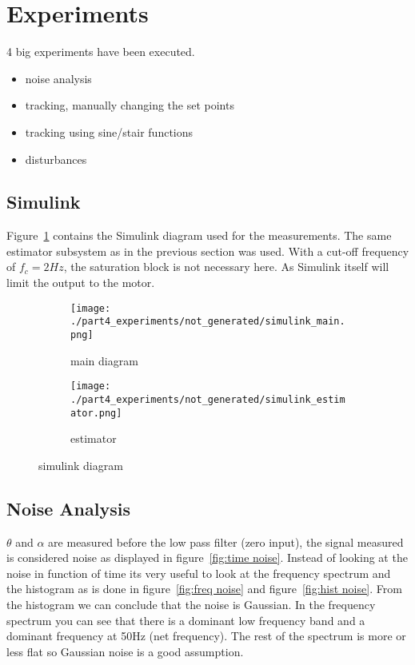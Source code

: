 \section{Experiments}

	4 big experiments have been executed.
	
	\begin{itemize}
		\item noise analysis
		\item tracking, manually changing the set points
		\item tracking using sine/stair functions
		\item disturbances
	\end{itemize}

\subsection{Simulink}
Figure~\ref{fig:simulink measurement diagram} contains the Simulink diagram used for the measurements. The same estimator subsystem as in the previous section was used. With a cut-off frequency of $f_c=2Hz$, the saturation block is not necessary here. As Simulink itself will limit the output to the motor.
	\begin{figure}[H]
	\centering
	\begin{subfigure}[b]{0.55\textwidth}
		\texttt{[image: ./part4\_experiments/not\_generated/simulink\_main.png]}
		\caption{main diagram}
	\end{subfigure}
	\begin{subfigure}[b]{0.45\textwidth}
		\texttt{[image: ./part4\_experiments/not\_generated/simulink\_estimator.png]}
		\caption{estimator}
	\end{subfigure}
	\caption{simulink diagram}
	\label{fig:simulink measurement diagram}
\end{figure}

\subsection{Noise Analysis}
	$\theta$ and $\alpha$ are measured before the low pass filter (zero input), the signal measured is considered noise as displayed in figure~\ref{fig:time noise}. Instead of looking at the noise in function of time its very useful to look at the frequency spectrum and the histogram as is done in figure~\ref{fig:freq noise} and figure~\ref{fig:hist noise}. From the histogram we can conclude that the noise is Gaussian. In the frequency spectrum you can see that there is a dominant low frequency band and a dominant frequency at 50Hz (net frequency). The rest of the spectrum is more or less flat so Gaussian noise is a good assumption.
	
